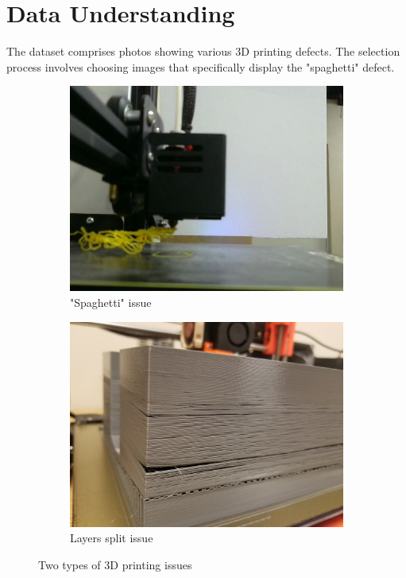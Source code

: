 \documentclass[12pt,a4paper]{article}
\begin{document}
\section{Data Understanding}
The dataset comprises photos showing various 3D printing defects. The selection process involves choosing images that specifically display the "spaghetti" defect.
\begin{figure}[h]
    \centering
    \begin{subfigure}[b]{0.45\textwidth}
        \centering
        \includegraphics[width=\textwidth]{no_support_0.jpg}
        \caption{"Spaghetti" issue\cite{onlineOpenSource1}}
        \label{fig:image1}
    \end{subfigure}
    \begin{subfigure}[b]{0.45\textwidth}
        \centering
        \includegraphics[width=\textwidth]{24382-129778-20190220-061954.jpg}
        \caption{Layers split issue\cite{onlineOpenSource2}}
        \label{fig:image2}
    \end{subfigure}
    \hfill

    \caption{Two types of 3D printing issues}
    \label{fig:test}
\end{figure}
\end{document}
